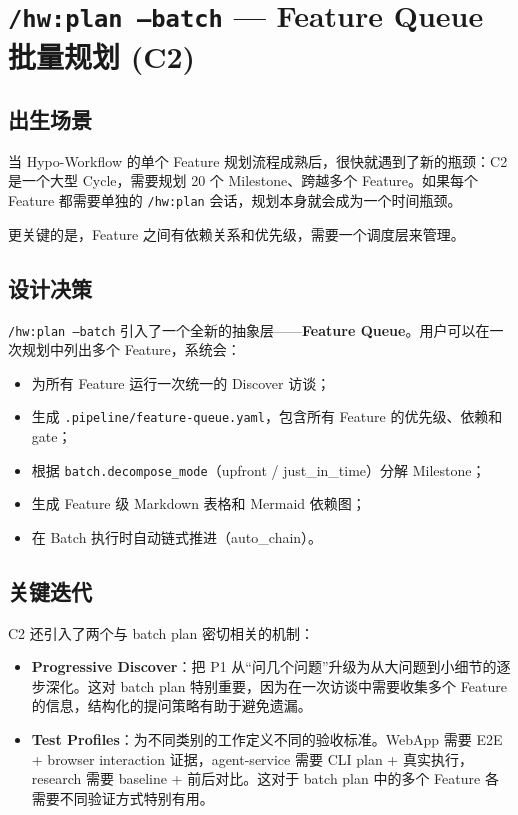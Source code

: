 \documentclass[
  outputdir=build,
  chapterstyle=cn,
  colorscheme=Simple,
  fontset=tech,
  code=false
]{Hypo-Note}
\begin{document}
\section{\texttt{/hw:plan --batch} — Feature Queue 批量规划 (C2)}

\subsection{出生场景}

当 Hypo-Workflow 的单个 Feature 规划流程成熟后，很快就遇到了新的瓶颈：C2 是一个大型 Cycle，需要规划 20 个 Milestone、跨越多个 Feature。如果每个 Feature 都需要单独的 \texttt{/hw:plan} 会话，规划本身就会成为一个时间瓶颈。

更关键的是，Feature 之间有依赖关系和优先级，需要一个调度层来管理。

\subsection{设计决策}

\texttt{/hw:plan --batch} 引入了一个全新的抽象层——\textbf{Feature Queue}。用户可以在一次规划中列出多个 Feature，系统会：

\begin{itemize}[leftmargin=2em]
  \item 为所有 Feature 运行一次统一的 Discover 访谈；
  \item 生成 \texttt{.pipeline/feature-queue.yaml}，包含所有 Feature 的优先级、依赖和 gate；
  \item 根据 \texttt{batch.decompose\_mode}（upfront / just\_in\_time）分解 Milestone；
  \item 生成 Feature 级 Markdown 表格和 Mermaid 依赖图；
  \item 在 Batch 执行时自动链式推进（auto\_chain）。
\end{itemize}

\subsection{关键迭代}

C2 还引入了两个与 batch plan 密切相关的机制：

\begin{itemize}[leftmargin=2em]
  \item \textbf{Progressive Discover}：把 P1 从“问几个问题”升级为从大问题到小细节的逐步深化。这对 batch plan 特别重要，因为在一次访谈中需要收集多个 Feature 的信息，结构化的提问策略有助于避免遗漏。
  \item \textbf{Test Profiles}：为不同类别的工作定义不同的验收标准。WebApp 需要 E2E + browser interaction 证据，agent-service 需要 CLI plan + 真实执行，research 需要 baseline + 前后对比。这对于 batch plan 中的多个 Feature 各需要不同验证方式特别有用。
\end{itemize}
\end{document}
